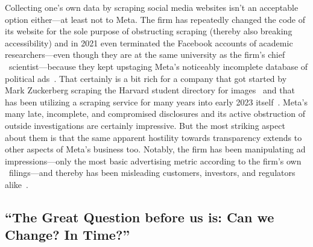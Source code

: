 Collecting one's own data by scraping social media websites isn't an acceptable
option either---at least not to Meta. The firm has repeatedly changed the code
of its website for the sole purpose of obstructing scraping (thereby also
breaking accessibility) and in 2021 even terminated the Facebook accounts of
academic researchers---even though they are at the same university as the firm's
chief \AI\ scientist---because they kept upstaging Meta's noticeably incomplete
database of political
ads~\cite{EdelsonMcCoy2021a,Faife2021a,MerrillTobin2019,Roose2021a}. That
certainly is a bit rich for a company that got started by Mark Zuckerberg
scraping the Harvard student directory for images~\cite{Madrigal2019} and that
has been utilizing a scraping service for many years into early 2023
itself~\cite{Newman2023}. Meta's many late, incomplete, and compromised
disclosures and its active obstruction of outside investigations are certainly
impressive. But the most striking aspect about them is that the same apparent
hostility towards transparency extends to other aspects of Meta's business too.
Notably, the firm has been manipulating ad impressions---only the most basic
advertising metric according to the firm's own \SEC\ filings---and thereby has
been misleading customers, investors, and regulators alike~\cite{grimm2022a}.


\let\Oldthefootnote\thefootnote
\renewcommand*{\thefootnote}{\ding{168}}
\subsection{``The Great Question before us is: Can we Change? In Time?''%
\texorpdfstring{\>\!\protect\footnotemark}{}}
\let\thefootnote\Oldthefootnote

